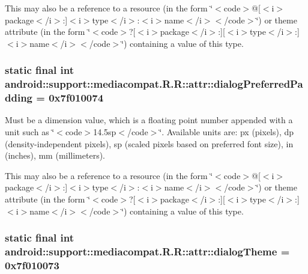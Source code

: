 This may also be a reference to a resource (in the form \char`\"{}$<$code$>$@\mbox{[}$<$i$>$package$<$/i$>$:\mbox{]}$<$i$>$type$<$/i$>$:$<$i$>$name$<$/i$>$$<$/code$>$\char`\"{}) or theme attribute (in the form \char`\"{}$<$code$>$?\mbox{[}$<$i$>$package$<$/i$>$:\mbox{]}\mbox{[}$<$i$>$type$<$/i$>$:\mbox{]}$<$i$>$name$<$/i$>$$<$/code$>$\char`\"{}) containing a value of this type. \hypertarget{classandroid_1_1support_1_1mediacompat_1_1_r_1_1attr_fd086d0bd0e5879d8205312536956fc5}{
\subsubsection[{dialogPreferredPadding}]{\setlength{\rightskip}{0pt plus 5cm}static final int android::support::mediacompat.R.R::attr::dialogPreferredPadding = 0x7f010074}}
\label{classandroid_1_1support_1_1mediacompat_1_1_r_1_1attr_fd086d0bd0e5879d8205312536956fc5}


Must be a dimension value, which is a floating point number appended with a unit such as \char`\"{}$<$code$>$14.5sp$<$/code$>$\char`\"{}. Available units are: px (pixels), dp (density-independent pixels), sp (scaled pixels based on preferred font size), in (inches), mm (millimeters). 

This may also be a reference to a resource (in the form \char`\"{}$<$code$>$@\mbox{[}$<$i$>$package$<$/i$>$:\mbox{]}$<$i$>$type$<$/i$>$:$<$i$>$name$<$/i$>$$<$/code$>$\char`\"{}) or theme attribute (in the form \char`\"{}$<$code$>$?\mbox{[}$<$i$>$package$<$/i$>$:\mbox{]}\mbox{[}$<$i$>$type$<$/i$>$:\mbox{]}$<$i$>$name$<$/i$>$$<$/code$>$\char`\"{}) containing a value of this type. \hypertarget{classandroid_1_1support_1_1mediacompat_1_1_r_1_1attr_03492302bca9a27bf4f913e3951cc98a}{
\subsubsection[{dialogTheme}]{\setlength{\rightskip}{0pt plus 5cm}static final int android::support::mediacompat.R.R::attr::dialogTheme = 0x7f010073}}
\label{classandroid_1_1support_1_1mediacompat_1_1_r_1_1attr_03492302bca9a27bf4f913e3951cc98a}


